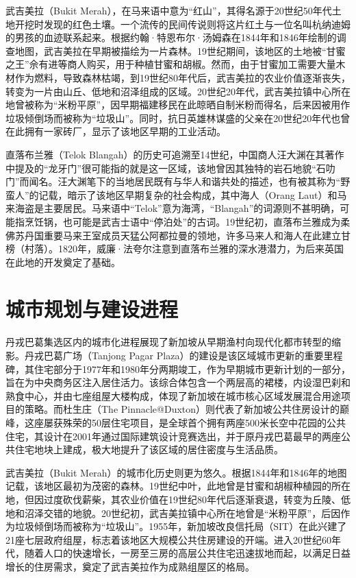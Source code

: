 \documentclass[11pt,a4paper,twoside,openany]{book}
\begin{document}
武吉美拉（Bukit Merah），在马来语中意为“红山”，其得名源于20世纪50年代土地开挖时发现的红色土壤。一个流传的民间传说则将这片红土与一位名叫杭纳迪姆的男孩的血迹联系起来。根据约翰·特恩布尔·汤姆森在1844年和1846年绘制的调查地图，武吉美拉在早期被描绘为一片森林。19世纪期间，该地区的土地被“甘蜜之王”佘有进等商人购买，用于种植甘蜜和胡椒。然而，由于甘蜜加工需要大量木材作为燃料，导致森林枯竭，到19世纪80年代后，武吉美拉的农业价值逐渐丧失，转变为一片由山丘、低地和沼泽组成的区域。20世纪20年代，武吉美拉镇中心所在地曾被称为“米粉平原”，因早期福建移民在此晾晒自制米粉而得名，后来因被用作垃圾倾倒场而被称为“垃圾山”。同时，抗日英雄林谋盛的父亲在20世纪20年代也曾在此拥有一家砖厂，显示了该地区早期的工业活动。

直落布兰雅（Telok Blangah）的历史可追溯至14世纪，中国商人汪大渊在其著作中提及的“龙牙门”很可能指的就是这一区域，该地曾因其独特的岩石地貌“石叻门”而闻名。汪大渊笔下的当地居民既有与华人和谐共处的描述，也有被其称为“野蛮人”的记载，暗示了该地区早期复杂的社会构成，其中海人（Orang Laut）和马来海盗是主要居民。马来语中“Telok”意为海湾，“Blangah”的词源则不甚明确，可能指烹饪锅，也可能是武吉士语中“停泊处”的古词。19世纪初，直落布兰雅成为柔佛苏丹国重要马来王室成员天猛公阿都拉曼的领地，许多马来人和海人在此建立甘榜（村落）。1820年，威廉·法夸尔注意到直落布兰雅的深水港潜力，为后来英国在此地的开发奠定了基础。

\section{城市规划与建设进程}
丹戎巴葛集选区内的城市化进程展现了新加坡从早期渔村向现代化都市转型的缩影。丹戎巴葛广场（Tanjong Pagar Plaza）的建设是该区域城市更新的重要里程碑，其住宅部分于1977年和1980年分两期竣工，作为早期城市更新计划的一部分，旨在为中央商务区注入居住活力。该综合体包含一个两层高的裙楼，内设湿巴刹和熟食中心，并由七座组屋大楼构成，体现了新加坡在城市核心区域发展混合用途项目的策略。而杜生庄（The Pinnacle@Duxton）则代表了新加坡公共住房设计的巅峰，这座屡获殊荣的50层住宅项目，是全球首个拥有两座500米长空中花园的公共住宅，其设计在2001年通过国际建筑设计竞赛选出，并于原丹戎巴葛最早的两座公共住宅地块上建成，极大地提升了该区域的居住密度与生活品质。

武吉美拉（Bukit Merah）的城市化历史则更为悠久。根据1844年和1846年的地图记载，该地区最初为茂密的森林。19世纪中叶，此地曾是甘蜜和胡椒种植园的所在地，但因过度砍伐薪柴，其农业价值在19世纪80年代后逐渐衰退，转变为丘陵、低地和沼泽交错的地貌。20世纪初，武吉美拉镇中心所在地曾是“米粉平原”，后因作为垃圾倾倒场而被称为“垃圾山”。1955年，新加坡改良信托局（SIT）在此兴建了21座七层政府组屋，标志着该地区大规模公共住房建设的开端。进入20世纪60年代，随着人口的快速增长，一房至三房的高层公共住宅迅速拔地而起，以满足日益增长的住房需求，奠定了武吉美拉作为成熟组屋区的格局。
\end{document}
